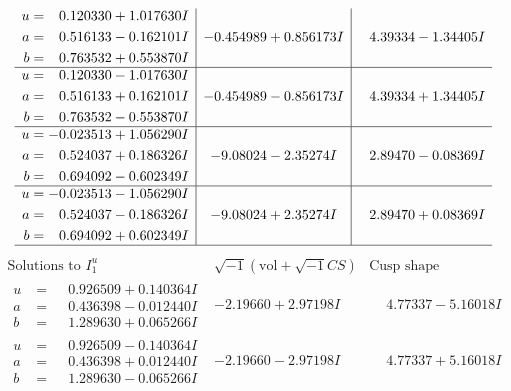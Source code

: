 \documentclass[1p]{elsarticle_modified}
\theoremstyle{definition}
\newcommand{\I}{\sqrt{-1}}
\begin{document}
$$\begin{array}{c|c|c}
\begin{aligned}
u &= \phantom{-}0.120330 + 1.017630 I \\
a &= \phantom{-}0.516133 - 0.162101 I \\
b &= \phantom{-}0.763532 + 0.553870 I\end{aligned}
 & -0.454989 + 0.856173 I & \phantom{-}4.39334 - 1.34405 I \\ \hline\begin{aligned}
u &= \phantom{-}0.120330 - 1.017630 I \\
a &= \phantom{-}0.516133 + 0.162101 I \\
b &= \phantom{-}0.763532 - 0.553870 I\end{aligned}
 & -0.454989 - 0.856173 I & \phantom{-}4.39334 + 1.34405 I \\ \hline\begin{aligned}
u &= -0.023513 + 1.056290 I \\
a &= \phantom{-}0.524037 + 0.186326 I \\
b &= \phantom{-}0.694092 - 0.602349 I\end{aligned}
 & -9.08024 - 2.35274 I & \phantom{-}2.89470 - 0.08369 I \\ \hline\begin{aligned}
u &= -0.023513 - 1.056290 I \\
a &= \phantom{-}0.524037 - 0.186326 I \\
b &= \phantom{-}0.694092 + 0.602349 I\end{aligned}
 & -9.08024 + 2.35274 I & \phantom{-}2.89470 + 0.08369 I\\
 \hline 
 \end{array}$$\newpage$$\begin{array}{c|c|c}  
\text{Solutions to }I^u_{1}& \I (\text{vol} + \sqrt{-1}CS) & \text{Cusp shape}\\
 \hline 
\begin{aligned}
u &= \phantom{-}0.926509 + 0.140364 I \\
a &= \phantom{-}0.436398 - 0.012440 I \\
b &= \phantom{-}1.289630 + 0.065266 I\end{aligned}
 & -2.19660 + 2.97198 I & \phantom{-}4.77337 - 5.16018 I \\ \hline\begin{aligned}
u &= \phantom{-}0.926509 - 0.140364 I \\
a &= \phantom{-}0.436398 + 0.012440 I \\
b &= \phantom{-}1.289630 - 0.065266 I\end{aligned}
 & -2.19660 - 2.97198 I & \phantom{-}4.77337 + 5.16018 I \\ \hline\begin{aligned}

\end{aligned}
\end{array}$$
\end{document}
